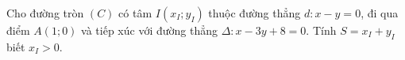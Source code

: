 \begin{bt}%
	Cho đường tròn $(C)$ có tâm $I(x_I;y_I)$ thuộc đường thẳng $ d\colon x-y=0$, đi qua điểm $A(1;0)$ và tiếp xúc với đường thẳng $\Delta \colon x-3y+8=0$. Tính $S=x_I+y_I$ biết $x_I>0$.
\end{bt}

